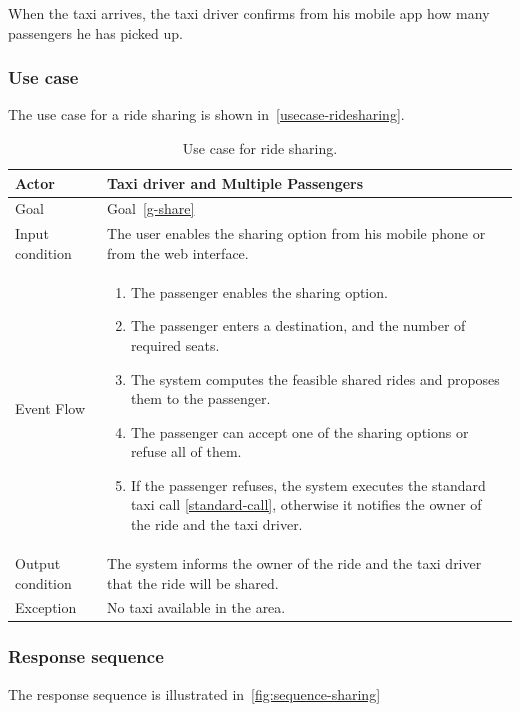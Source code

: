 When the taxi arrives, the taxi driver confirms from his mobile app how many passengers he has picked up.

\subsubsection{Use case}
The use case for a ride sharing is shown in~\autoref{usecase-ridesharing}.

\begin{table}
\begin{center}
\begin{tabular}{| l | p{} |}
\hline
Actor & Taxi driver and Multiple Passengers \\
\hline
Goal & Goal~\ref{g-share}
\\
\hline
Input condition & The user enables the sharing option from his mobile phone or from the web interface.  \\
\hline
Event Flow &
\begin{enumerate}
	\item The passenger enables the sharing option.
	\item The passenger enters a destination, and the number of required seats.
	\item The system computes the feasible shared rides and proposes them to the passenger.
	\item The passenger can accept one of the sharing options or refuse all of them.
	\item If the passenger refuses, the system executes the standard taxi call \ref{standard-call}, otherwise it notifies the owner of the ride and the taxi driver.
\end{enumerate}
\\
\hline
Output condition & The system informs the owner of the ride and the taxi driver that the ride will be shared. \\
\hline
Exception & No taxi available in the area. \\
\hline
\end{tabular}
\end{center}
\caption{Use case for ride sharing.}
\label{usecase-ridesharing}
\end{table}

\subsubsection{Response sequence}
The response sequence is illustrated in~\autoref{fig:sequence-sharing}

